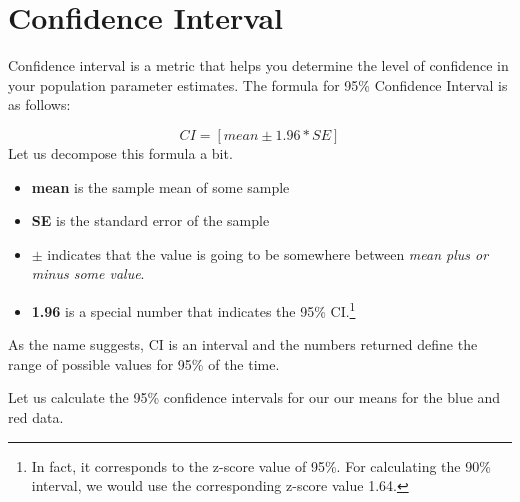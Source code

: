 \documentclass[
]{book}
\providecommand{\tightlist}{%
  \setlength{\itemsep}{0pt}\setlength{\parskip}{0pt}}
\begin{document}
\section{Confidence Interval}\label{confidence-interval}

Confidence interval is a metric that helps you determine the level of confidence in your population parameter estimates. The formula for 95\% Confidence Interval is as follows:

\[CI = [mean \pm 1.96 * SE ]\]
Let us decompose this formula a bit.

\begin{itemize}
\tightlist
\item
  \textbf{mean} is the sample mean of some sample
\item
  \textbf{SE} is the standard error of the sample
\item
  \(\pm\) indicates that the value is going to be somewhere between \emph{mean plus or minus some value}.
\item
  \textbf{1.96} is a special number that indicates the 95\% CI.\footnote{In fact, it corresponds to the z-score value of 95\%. For calculating the 90\% interval, we would use the corresponding z-score value 1.64.}
\end{itemize}

As the name suggests, CI is an interval and the numbers returned define the range of possible values for 95\% of the time.

Let us calculate the 95\% confidence intervals for our our means for the blue and red data.
\end{document}
